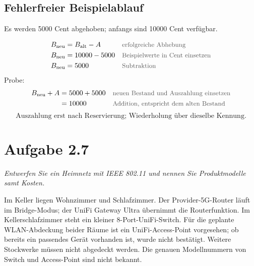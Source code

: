 \documentclass[a4paper,11pt]{article}
\newif\ifexplain
\newcommand{\aufgabe}[1]{\section*{Aufgabe #1}}
\newcommand{\angabe}[1]{{\raggedright\textit{#1}\par}\smallskip}
\newcommand{\why}[1]{\text{\small\color{black!65}#1}}
\newcommand{\explain}[1]{\ifexplain\begin{erklbox}#1\end{erklbox}\fi}
\begin{document}
\subsection*{Fehlerfreier Beispielablauf}
Es werden 5000 Cent abgehoben; anfangs sind 10000 Cent verfügbar.
\begin{center}
\end{center}
\explain{Das Diagramm zeigt die Nachrichten zwischen zwei Teilnehmern. Die Bargeldausgabe passiert lokal und wird deshalb als Aktion beim Automaten eingezeichnet. Die Transaktionskennung T bleibt bei Vorbereitung, Verbuchung und einer möglichen Statusabfrage gleich.}
\begin{align*}
B_{\mathrm{neu}}&=B_{\mathrm{alt}}-A &&\why{erfolgreiche Abhebung}\\
B_{\mathrm{neu}}&=10000-5000 &&\why{Beispielwerte in Cent einsetzen}\\
B_{\mathrm{neu}}&=5000 &&\why{Subtraktion}
\end{align*}
Probe:
\begin{align*}
B_{\mathrm{neu}}+A&=5000+5000 &&\why{neuen Bestand und Auszahlung einsetzen}\\
&=10000 &&\why{Addition, entspricht dem alten Bestand}
\end{align*}
\[\boxed{\text{Auszahlung erst nach Reservierung; Wiederholung über dieselbe Kennung.}}\]

\aufgabe{2.7}
\angabe{Entwerfen Sie ein Heimnetz mit IEEE 802.11 und nennen Sie Produktmodelle samt Kosten.}
Im Keller liegen Wohnzimmer und Schlafzimmer. Der Provider-5G-Router läuft im Bridge-Modus; der UniFi Gateway Ultra übernimmt die Routerfunktion. Im Kellerschlafzimmer steht ein kleiner 8-Port-UniFi-Switch. Für die geplante WLAN-Abdeckung beider Räume ist ein UniFi-Access-Point vorgesehen; ob bereits ein passendes Gerät vorhanden ist, wurde nicht bestätigt. Weitere Stockwerke müssen nicht abgedeckt werden. Die genauen Modellnummern von Switch und Access-Point sind nicht bekannt.
\end{document}
